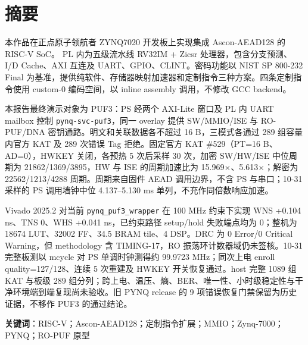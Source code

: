 \chapter*{摘要}

本作品在正点原子领航者 ZYNQ7020 开发板上实现集成 Ascon-AEAD128 的 RISC-V SoC。 PL 内为五级流水线 RV32IM + Zicsr 处理器，包含分支预测、I/D Cache、AXI 互连及 UART、GPIO、CLINT。密码功能以 NIST SP 800-232 Final 为基准，提供纯软件、存储器映射加速器和定制指令三种方案。四条定制指令使用 custom-0 编码空间，以 inline assembly 调用，不修改 GCC backend。

本报告最终演示对象为 PUF3：PS 经两个 AXI-Lite 窗口及 PL 内 UART mailbox 控制 \texttt{pynq-svc-puf3}，同一 overlay 提供 SW/MMIO/ISE 与 RO-PUF/DNA 密钥通路。明文和关联数据各不超过 16 B，三模式各通过 289 组容量内官方 KAT 及 289 次错误 Tag 拒绝。固定官方 KAT \#529（PT=16 B、AD=0），HWKEY 关闭，各预热 5 次后采样 30 次，加密 SW/HW/ISE 中位周期为 21862/1369/3895，HW 与 ISE 的周期加速比为 15.969$\times$、5.613$\times$；解密为 22562/1213/4288 周期。周期来自固件 AEAD 调用边界，不含 PS 与串口；10-31 采样的 PS 调用墙钟中位 4.137--5.130 ms 单列，不充作同倍数响应加速。

Vivado 2025.2 对当前 \texttt{pynq\_puf3\_wrapper} 在 100 MHz 约束下实现 WNS +0.104 ns、TNS 0、WHS +0.041 ns，已约束路径 setup/hold 失败端点均为 0；整机为 18674 LUT、32002 FF、34.5 BRAM tile、4 DSP。DRC 为 0 Error/0 Critical Warning，但 methodology 含 TIMING-17，RO 振荡环计数器域仍未签核。10-31 完整板测以 mcycle 对 PS 单调时钟测得约 99.9723 MHz；同次上电 enroll quality=127/128、连续 5 次重建及 HWKEY 开关恢复通过。host 完整 1089 组 KAT 与板级 289 组分列；跨上电、温压、熵、BER、唯一性、小时级稳定性与干净环境端到端复现尚未验收。旧 PYNQ release 的 9 项错误恢复门禁保留为历史证据，不移作 PUF3 的通过结论。

\textbf{关键词}：RISC-V；Ascon-AEAD128；定制指令扩展；MMIO；Zynq-7000；PYNQ；RO-PUF 原型
